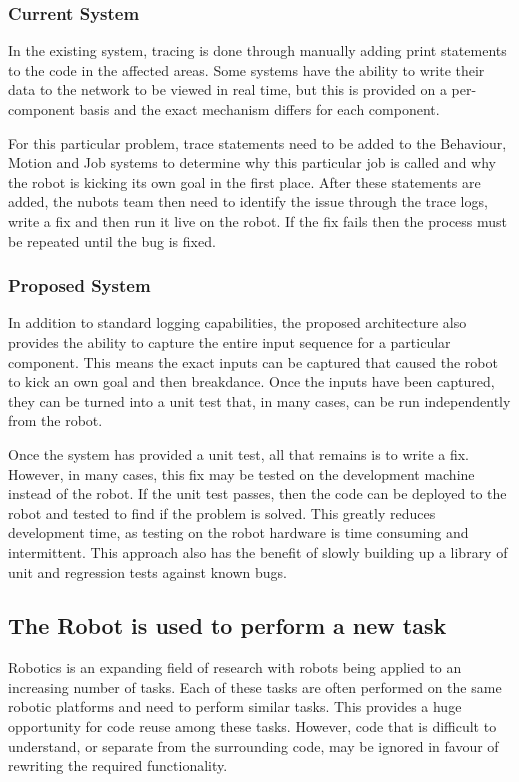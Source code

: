 \documentclass[english,12pt]{scrartcl}
\begin{document}
			\subsubsection{Current System}
				In the existing system, tracing is done through manually adding print statements to the code in the affected areas.
				Some systems have the ability to write their data to the network to be viewed in real time, but this is provided on a per-component basis and the exact mechanism differs for each component.

				For this particular problem, trace statements need to be added to the Behaviour, Motion and Job systems to determine why this particular job is called and why the robot is kicking its own goal in the first place.
				After these statements are added, the \gls{nubots} team then need to identify the issue through the trace logs, write a fix and then run it live on the robot. If the fix fails then the process must be repeated until the bug is fixed.

			\subsubsection{Proposed System}
				In addition to standard logging capabilities, the proposed architecture also provides the ability to capture the entire input sequence for a particular component.
				This means the exact inputs can be captured that caused the robot to kick an own goal and then breakdance.
				Once the inputs have been captured, they can be turned into a unit test that, in many cases, can be run independently from the robot.

				Once the system has provided a unit test, all that remains is to write a fix.
				However, in many cases, this fix may be tested on the development machine instead of the robot.
				If the unit test passes, then the code can be deployed to the robot and tested to find if the problem is solved.
				This greatly reduces development time, as testing on the robot hardware is time consuming and intermittent.
				This approach also has the benefit of slowly building up a library of unit and regression tests against known bugs.

		\subsection{The Robot is used to perform a new task}
			Robotics is an expanding field of research with robots being applied to an increasing number of tasks.
			Each of these tasks are often performed on the same robotic platforms and need to perform similar tasks.
			This provides a huge opportunity for code reuse among these tasks.
			However, code that is difficult to understand, or separate from the surrounding code, may be ignored in favour of rewriting the required functionality.
\end{document}
